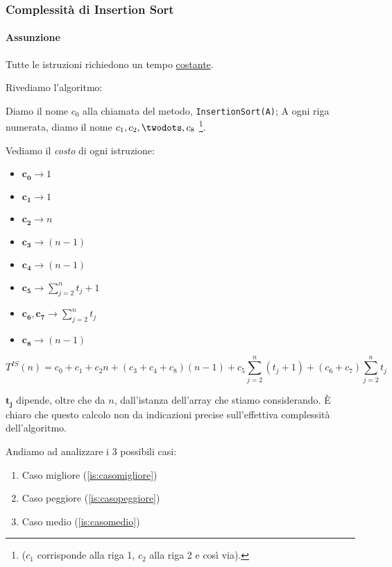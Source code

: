 \subsubsection{Complessità di Insertion Sort} \label{is:complessita}
\paragraph{Assunzione} Tutte le istruzioni richiedono un tempo \underline{costante}.

Rivediamo l'algoritmo:



Diamo il nome $c_0$ alla chiamata del metodo, \texttt{InsertionSort(A)};
A ogni riga numerata, diamo il nome $c_1, c_2,\twodots ,c_8$
\footnote{($c_1$ corrisponde alla riga 1, $c_2$ alla riga 2 e così via).}.\par
Vediamo il \emph{costo} di ogni istruzione:

\begin{itemize}
    \item[] $\boldsymbol{c_0} \rightarrow 1$
    \item[] $\boldsymbol{c_1} \rightarrow 1$
    \item[] $\boldsymbol{c_2} \rightarrow n$
    \item[] $\boldsymbol{c_3} \rightarrow (n-1)$
    \item[] $\boldsymbol{c_4} \rightarrow (n-1)$
    \item[] $\boldsymbol{c_5} \rightarrow \displaystyle\sum_{j=2}^{n} t_j+1$
    \item[] $\boldsymbol{c_6}, \boldsymbol{c_7} \rightarrow \displaystyle\sum_{j=2}^{n} t_j$
    \item[] $\boldsymbol{c_8} \rightarrow (n-1)$
\end{itemize}
 
\begin{displaymath}
    T^{IS}(n) = c_0 + c_1 + c_2n + (c_3+c_4+c_8)(n-1)
    + c_5\displaystyle\sum_{j=2}^{n}(t_j+1) + (c_6+c_7)\displaystyle\sum_{j=2}^{n}t_j
\end{displaymath}

$\boldsymbol{t_j}$ dipende, oltre che da $n$, dall'istanza dell'array
che stiamo considerando.
È chiaro che questo calcolo non da indicazioni precise sull'effettiva
complessità dell'algoritmo.\par

\bigskip
Andiamo ad analizzare i 3 possibili casi:

\begin{enumerate}[label=\emph{\alph*})]
    \item Caso migliore (\ref{is:casomigliore})
    \item Caso peggiore (\ref{is:casopeggiore})
    \item Caso medio (\ref{is:casomedio})
\end{enumerate}

